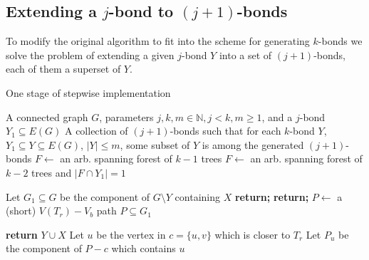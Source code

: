 \subsection*{Extending a $j$-bond to $(j+1)$-bonds}

To modify the original algorithm to fit into the scheme for generating $k$-bonds we solve the problem of extending a given $j$-bond $Y$ into a set of $(j+1)$-bonds, each of them a superset of $Y$.

\begin{algorithm}
	\caption{One stage of stepwise implementation}
	\label{algorithm-one_stage}
\begin{algorithmic}[1]
	\Require A connected graph $G$, parameters $j, k, m \in \mathbb{N}, j < k, m \geq 1$, and a $j$-bond $Y_1 \subseteq E(G)$
	\Ensure A collection of $(j+1)$-bonds such that for each $k$-bond $Y$, $Y_1 \subseteq Y \subseteq E(G)$, $\lvert Y \rvert \leq m$, some subset of $Y$ is among the generated $(j+1)$-bonds
	 
		\State $F \leftarrow$ an arb. spanning forest of $k-1$ trees
		\Else {}
		\State $F \leftarrow$ an arb. spanning forest of $k-2$ trees and ${\lvert F \cap Y_1 \rvert = 1}$
	\EndIf
		\State {}
	\EndFor

	\State Let $G_1 \subseteq G$ be the component of $G \setminus Y$ containing $X$
		\State \textbf{return;}
	\EndIf
		\State \textbf{return;}
	\EndIf
	\State $P \leftarrow$ a (short) $V(T_r){-}V_b$ path $P \subseteq G_1$

		\State \textbf{return} $Y \cup X$ 
	\Else
			\State Let $u$ be the vertex in $c = \{u,v\}$ which is closer to $T_r$
			\State Let $P_u$ be the component of $P - c$ which contains $u$
			\State {}
		\EndFor
	\EndIf

	\EndProcedure
\end{algorithmic}
\end{algorithm}

